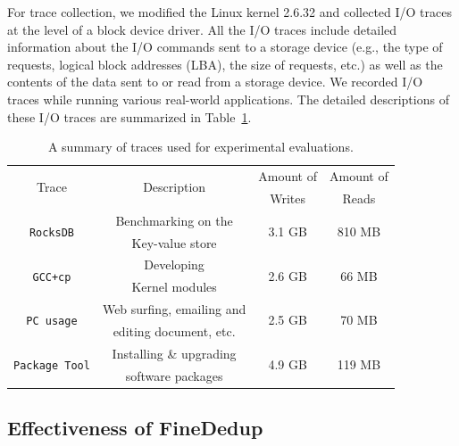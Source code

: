 For trace collection, 
we modified the Linux kernel 2.6.32 and collected I/O traces at the level of a block device driver.
All the I/O traces include detailed information about the I/O commands sent to a storage device
(e.g., the type of requests, logical block addresses (LBA), the size of requests, etc.) 
as well as the contents of the data sent to or read from a storage device.
We recorded I/O traces while running various real-world applications.
The detailed descriptions of these I/O traces are summarized in Table~\ref{tab:traces}.

\begin{table}[t]
	\renewcommand{\tabcolsep}{1.4mm} 
	\centering
	\begin{tabular}{c|c|c|c}
		\hline
		\multirow{2}{*}{Trace} 		& \multirow{2}{*}{Description} 		& Amount of 	& Amount of \\
							   		& 			 				  		& Writes 		& Reads \\
		\hline
		\hline
		\multirow{2}{*}{\texttt{RocksDB}} 		& Benchmarking on the  & \multirow{2}{*}{3.1 GB} 	& \multirow{2}{*}{810 MB} \\
									   	   	    & Key-value store  		& 						 	& 						  \\
		\hline
		\multirow{2}{*}{\texttt{GCC+cp}}    	& Developing 		& \multirow{2}{*}{2.6 GB} 	& \multirow{2}{*}{66 MB} \\
											   	& Kernel modules  		& 							& 					   \\

		\hline
		\multirow{2}{*}{\texttt{PC usage}} 	   	& Web surfing, emailing and & \multirow{2}{*}{2.5 GB} 	& \multirow{2}{*}{70 MB} \\
											   	& editing document, etc. &   						& 						  \\

		\hline
		\multirow{2}{*}{\texttt{Package Tool}} 	 & Installing \& upgrading & \multirow{2}{*}{4.9 GB} 	& \multirow{2}{*}{119 MB} \\
										   	 & software packages			& 						   	& 					   \\
		\hline
	\end{tabular}
	\caption{A summary of traces used for experimental evaluations.}
	\label{tab:traces}
\end{table}


\subsection{Effectiveness of FineDedup}

